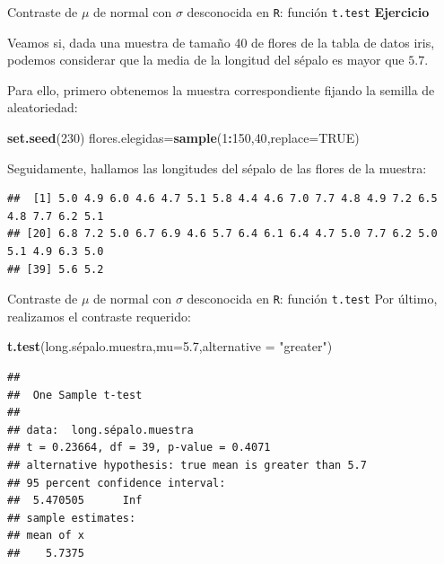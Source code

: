 \documentclass[
  ignorenonframetext,
]{beamer}
\newenvironment{Shaded}{\begin{snugshade}}{\end{snugshade}}
\newcommand{\DataTypeTok}[1]{\textcolor[rgb]{0.13,0.29,0.53}{#1}}
\newcommand{\DecValTok}[1]{\textcolor[rgb]{0.00,0.00,0.81}{#1}}
\newcommand{\FloatTok}[1]{\textcolor[rgb]{0.00,0.00,0.81}{#1}}
\newcommand{\KeywordTok}[1]{\textcolor[rgb]{0.13,0.29,0.53}{\textbf{#1}}}
\newcommand{\NormalTok}[1]{#1}
\newcommand{\OperatorTok}[1]{\textcolor[rgb]{0.81,0.36,0.00}{\textbf{#1}}}
\newcommand{\OtherTok}[1]{\textcolor[rgb]{0.56,0.35,0.01}{#1}}
\newcommand{\StringTok}[1]{\textcolor[rgb]{0.31,0.60,0.02}{#1}}
\begin{document}
\begin{frame}[fragile]{Contraste de \(\mu\) de normal con \(\sigma\)
desconocida en \texttt{R}: función \texttt{t.test}}
\protect\hypertarget{contraste-de-mu-de-normal-con-sigma-desconocida-en-r-funciuxf3n-t.test-4}{}
\textbf{Ejercicio}

Veamos si, dada una muestra de tamaño 40 de flores de la tabla de datos
iris, podemos considerar que la media de la longitud del sépalo es mayor
que \(5.7\).

Para ello, primero obtenemos la muestra correspondiente fijando la
semilla de aleatoriedad:

\begin{Shaded}
\begin{Highlighting}[]
\KeywordTok{set.seed}\NormalTok{(}\DecValTok{230}\NormalTok{)}
\NormalTok{flores.elegidas=}\KeywordTok{sample}\NormalTok{(}\DecValTok{1}\OperatorTok{:}\DecValTok{150}\NormalTok{,}\DecValTok{40}\NormalTok{,}\DataTypeTok{replace=}\OtherTok{TRUE}\NormalTok{)}
\end{Highlighting}
\end{Shaded}

Seguidamente, hallamos las longitudes del sépalo de las flores de la
muestra:

\begin{Shaded}
\end{Shaded}

\begin{verbatim}
##  [1] 5.0 4.9 6.0 4.6 4.7 5.1 5.8 4.4 4.6 7.0 7.7 4.8 4.9 7.2 6.5 4.8 7.7 6.2 5.1
## [20] 6.8 7.2 5.0 6.7 6.9 4.6 5.7 6.4 6.1 6.4 4.7 5.0 7.7 6.2 5.0 5.1 4.9 6.3 5.0
## [39] 5.6 5.2
\end{verbatim}
\end{frame}

\begin{frame}[fragile]{Contraste de \(\mu\) de normal con \(\sigma\)
desconocida en \texttt{R}: función \texttt{t.test}}
\protect\hypertarget{contraste-de-mu-de-normal-con-sigma-desconocida-en-r-funciuxf3n-t.test-5}{}
Por último, realizamos el contraste requerido:

\begin{Shaded}
\begin{Highlighting}[]
\KeywordTok{t.test}\NormalTok{(long.sépalo.muestra,}\DataTypeTok{mu=}\FloatTok{5.7}\NormalTok{,}\DataTypeTok{alternative =} \StringTok{"greater"}\NormalTok{)}
\end{Highlighting}
\end{Shaded}

\begin{verbatim}
## 
##  One Sample t-test
## 
## data:  long.sépalo.muestra
## t = 0.23664, df = 39, p-value = 0.4071
## alternative hypothesis: true mean is greater than 5.7
## 95 percent confidence interval:
##  5.470505      Inf
## sample estimates:
## mean of x 
##    5.7375
\end{verbatim}
\end{frame}
\end{document}
